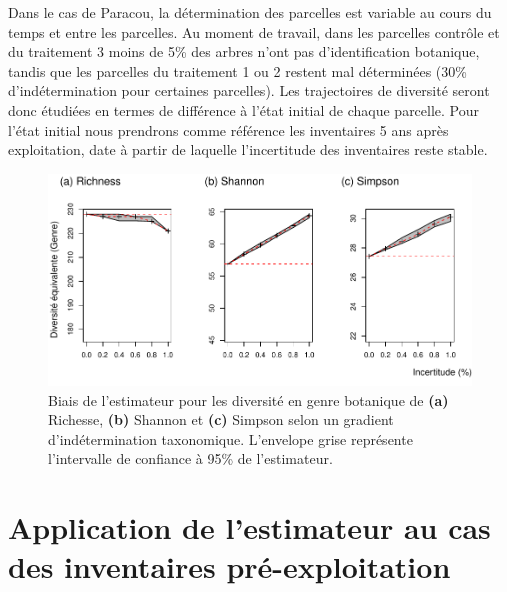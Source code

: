 \documentclass[
  11pt,
  french,
  A4paper,
  extrafontsizes,onecolumn,openright
  ]{memoir}
\begin{document}
Dans le cas de Paracou, la détermination des parcelles est variable au
cours du temps et entre les parcelles. Au moment de travail, dans les
parcelles contrôle et du traitement 3 moins de 5\% des arbres n'ont pas
d'identification botanique, tandis que les parcelles du traitement 1 ou
2 restent mal déterminées (30\% d'indétermination pour certaines
parcelles). Les trajectoires de diversité seront donc étudiées en termes
de différence à l'état initial de chaque parcelle. Pour l'état initial
nous prendrons comme référence les inventaires 5 ans après exploitation,
date à partir de laquelle l'incertitude des inventaires reste stable.

\begin{figure}

{\centering \includegraphics[width=0.6\linewidth]{Manuscript_files/figure-latex/FigTreesGenus-1} 

}

\caption{Biais de l'estimateur pour les diversité en genre botanique de \textbf{(a)} Richesse, \textbf{(b)} Shannon et \textbf{(c)} Simpson selon un gradient d'indétermination taxonomique. L'envelope grise représente l'intervalle de confiance à 95\% de l'estimateur.}\label{fig:FigTreesGenus}
\end{figure}

\section{Application de l'estimateur au cas des inventaires
pré-exploitation}\label{application-de-lestimateur-au-cas-des-inventaires-pre-exploitation}
\end{document}
